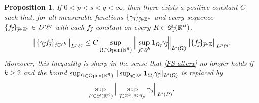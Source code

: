 \documentclass[11pt, reqno]{amsart}
\newtheorem{proposition}[theorem]{Proposition}
\theoremstyle{definition}
\theoremstyle{remark}
\numberwithin{equation}{section}
\newcommand{\D}{\mathscr D}
\newcommand{\R}{\mathbb R}
\newcommand{\vj}{\vec{\textit{\j}}}
\newcommand{\vn}{\vec n}
\newcommand{\one}{\mathbf{1}}
\newcommand{\aveL}{\textit{\L}}
\newcommand{\bNorm}[2]{\big\|#1\big\|_{#2}}
\newcommand{\Open}{\mathrm{Open}}
\begin{document}
\begin{proposition}\label{carl last 2x}
If $0<p<s<q<\infty$,
then there exists a positive constant $C$ such that,
for all measurable functions $\{\gamma_{\vj}\}_{\vj\in\mathbb Z^k}$ and
every sequence $\{f_{\vj}\}_{\vj\in\mathbb Z^k}\in L^p\ell^q$
with each $f_{\vj}$ constant on every $R\in\D_{\vj}(\mathbb R^{\vec n})$,
\begin{equation}\label{FS-alterx}
\bNorm{\{\gamma_{\vj}f_{\vj}\}_{\vj\in\mathbb Z^k}}{L^p\ell^q}
\le C\sup_{\Omega\in\Open(\R^{\vn})}\Big\|\sup_{\vj\in\mathbb Z^k}\one_{\Omega_{\vj}}\gamma_{\vj}\Big\|_{\aveL^s(\Omega)}
\bNorm{\{ f_{\vj}\}_{\vj\in\mathbb Z}}{L^p\ell^q}.
\end{equation}
Moreover, this inequality is sharp in the sense that
\eqref{FS-alterx} no longer holds if $k\geq 2$ and
the bound $\sup_{\Omega\in\Open(\R^{\vn})}\|\sup_{\vj\in\mathbb Z^k}\one_{\Omega_{\vj}}\gamma_{\vj}\|_{\aveL^s(\Omega)}$
is replaced by
$$
\sup_{P\in \D(\mathbb R^{\vec n})}
\Big\|\sup_{\vj\in\mathbb Z^k,\,\vj\geq \vj_P}
\gamma_{\vj}\Big\|_{\aveL^s(P)}.
$$
\end{proposition}
\end{document}
